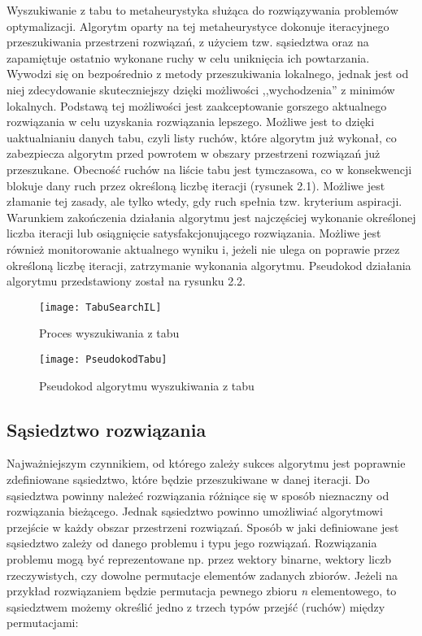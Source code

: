 Wyszukiwanie z tabu to metaheurystyka służąca do rozwiązywania problemów optymalizacji. Algorytm oparty na tej metaheurystyce dokonuje iteracyjnego przeszukiwania przestrzeni rozwiązań, z użyciem tzw. sąsiedztwa oraz na zapamiętuje ostatnio wykonane ruchy w celu uniknięcia ich powtarzania. Wywodzi się on bezpośrednio z metody przeszukiwania lokalnego, jednak jest od niej zdecydowanie skuteczniejszy dzięki możliwości ,,wychodzenia'' z minimów lokalnych. Podstawą tej możliwości jest zaakceptowanie gorszego aktualnego rozwiązania w celu uzyskania rozwiązania lepszego. Możliwe jest to dzięki uaktualnianiu danych tabu, czyli listy ruchów, które algorytm już wykonał, co zabezpiecza algorytm przed powrotem w obszary przestrzeni rozwiązań już przeszukane. Obecność ruchów na liście tabu jest tymczasowa, co w konsekwencji blokuje dany ruch przez określoną liczbę iteracji (rysunek 2.1). Możliwe jest złamanie tej zasady, ale tylko wtedy, gdy ruch spełnia tzw. kryterium aspiracji. Warunkiem zakończenia działania algorytmu jest najczęściej wykonanie określonej liczba iteracji lub osiągnięcie satysfakcjonującego rozwiązania. Możliwe jest również monitorowanie aktualnego wyniku i, jeżeli nie ulega on poprawie przez określoną liczbę iteracji, zatrzymanie wykonania algorytmu. Pseudokod działania algorytmu przedstawiony został na rysunku 2.2.

\begin{figure}
	\centering
	\texttt{[image: TabuSearchIL]}
	\caption{Proces wyszukiwania z tabu}
	\label{fig: TabuSearchIL}
\end{figure}

\begin{figure}
	\centering
	\texttt{[image: PseudokodTabu]}
	\caption{Pseudokod algorytmu wyszukiwania z tabu}
	\label{fig: AlgorytmTabu}
\end{figure}

\subsection{Sąsiedztwo rozwiązania}

Najważniejszym czynnikiem, od którego zależy sukces algorytmu jest poprawnie zdefiniowane sąsiedztwo, które będzie przeszukiwane w danej iteracji. Do sąsiedztwa powinny należeć rozwiązania różniące się w sposób nieznaczny od rozwiązania bieżącego. Jednak sąsiedztwo powinno umożliwiać algorytmowi przejście w każdy obszar przestrzeni rozwiązań. Sposób w jaki definiowane jest sąsiedztwo zależy od danego problemu i typu jego rozwiązań. Rozwiązania problemu mogą być reprezentowane np. przez wektory binarne, wektory liczb rzeczywistych, czy dowolne permutacje elementów zadanych zbiorów. Jeżeli na przykład rozwiązaniem będzie permutacja pewnego zbioru \textit{n} elementowego, to sąsiedztwem możemy określić jedno z trzech typów przejść (ruchów) między permutacjami:

